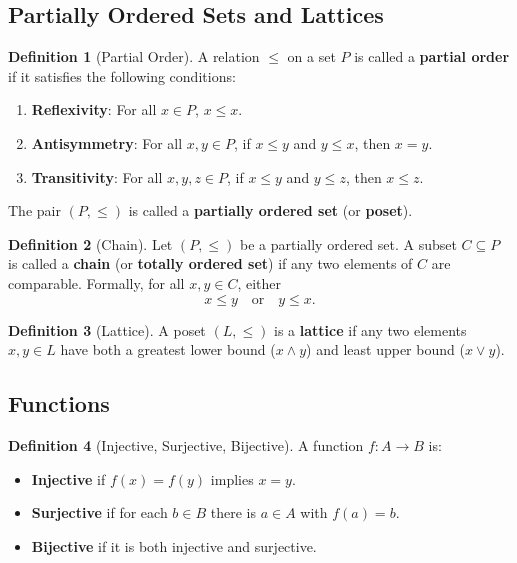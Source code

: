 \documentclass[12pt]{article}
\theoremstyle{definition} %
\newtheorem{definition}{Definition}
\theoremstyle{plain} %
\begin{document}
\subsection{Partially Ordered Sets and Lattices}
\begin{definition}[Partial Order]
    A relation \(\le\) on a set \(P\) is called a \textbf{partial order} if it satisfies the following conditions:
    \begin{enumerate}[label=(\roman*)]
        \item \textbf{Reflexivity}: For all \(x \in P\), \(x \le x\).
        \item \textbf{Antisymmetry}: For all \(x,y \in P\), if \(x \le y\) and \(y \le x\), then \(x = y\).
        \item \textbf{Transitivity}: For all \(x,y,z \in P\), if \(x \le y\) and \(y \le z\), then \(x \le z\).
    \end{enumerate}
    The pair \((P, \le)\) is called a \textbf{partially ordered set} (or \textbf{poset}).
    \end{definition}

    \begin{definition}[Chain]
        Let \((P, \leq)\) be a partially ordered set. A subset \(C \subseteq P\) is called a \textbf{chain} (or \textbf{totally ordered set}) if any two elements of \(C\) are comparable. Formally, for all \(x, y \in C\), either
        \[
        x \leq y \quad\text{or}\quad y \leq x.
        \]
        \end{definition}

\begin{definition}[Lattice]
A poset \((L, \le)\) is a \textbf{lattice} if any two elements \(x,y \in L\) have both a greatest lower bound (\(x \wedge y\)) and least upper bound (\(x \vee y\)).
\end{definition}

\subsection{Functions}
\begin{definition}[Injective, Surjective, Bijective]
A function \(f: A \to B\) is:
\begin{itemize}
\item \textbf{Injective} if \(f(x)=f(y)\) implies \(x=y\).
\item \textbf{Surjective} if for each \(b \in B\) there is \(a \in A\) with \(f(a)=b\).
\item \textbf{Bijective} if it is both injective and surjective.
\end{itemize}
\end{definition}
\end{document}
